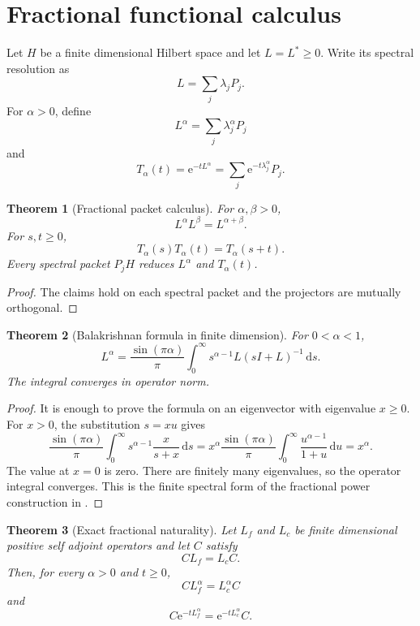 \documentclass{aomart}
\newtheorem{theorem}{Theorem}[section]
\theoremstyle{definition}
\theoremstyle{remark}
\newcommand{\e}{\mathrm e}
\newcommand{\dd}{\,\mathrm d}
\begin{document}
\section{Fractional functional calculus}\label{sec:fractional}

Let \(H\) be a finite dimensional Hilbert space and let \(L=L^*\geq0\). Write its spectral resolution as
\[
L=\sum_j\lambda_jP_j.
\]
For \(\alpha>0\), define
\[
L^\alpha
=
\sum_j\lambda_j^\alpha P_j
\]
and
\[
T_\alpha(t)
=
\e^{-tL^\alpha}
=
\sum_j\e^{-t\lambda_j^\alpha}P_j.
\]

\begin{theorem}[Fractional packet calculus]\label{thm:fractional_packet_calculus}
For \(\alpha,\beta>0\),
\[
L^\alpha L^\beta=L^{\alpha+\beta}.
\]
For \(s,t\geq0\),
\[
T_\alpha(s)T_\alpha(t)=T_\alpha(s+t).
\]
Every spectral packet \(P_jH\) reduces \(L^\alpha\) and \(T_\alpha(t)\).
\end{theorem}

\begin{proof}
The claims hold on each spectral packet and the projectors are mutually orthogonal.
\end{proof}

\begin{theorem}[Balakrishnan formula in finite dimension]\label{thm:balakrishnan}
For \(0<\alpha<1\),
\[
L^\alpha
=
\frac{\sin(\pi\alpha)}{\pi}
\int_0^\infty
s^{\alpha-1}L(sI+L)^{-1}
\dd s.
\]
The integral converges in operator norm.
\end{theorem}

\begin{proof}
It is enough to prove the formula on an eigenvector with eigenvalue \(x\geq0\). For \(x>0\), the substitution \(s=xu\) gives
\[
\frac{\sin(\pi\alpha)}{\pi}
\int_0^\infty
s^{\alpha-1}\frac{x}{s+x}\dd s
=x^\alpha
\frac{\sin(\pi\alpha)}{\pi}
\int_0^\infty\frac{u^{\alpha-1}}{1+u}\dd u
=x^\alpha.
\]
The value at \(x=0\) is zero. There are finitely many eigenvalues, so the operator integral converges. This is the finite spectral form of the fractional power construction in \cite{Balakrishnan1960}.
\end{proof}

\begin{theorem}[Exact fractional naturality]\label{thm:exact_fractional_naturality}
Let \(L_f\) and \(L_c\) be finite dimensional positive self adjoint operators and let \(C\) satisfy
\[
CL_f=L_cC.
\]
Then, for every \(\alpha>0\) and \(t\geq0\),
\[
CL_f^\alpha=L_c^\alpha C
\]
and
\[
C\e^{-tL_f^\alpha}
=
\e^{-tL_c^\alpha}C.
\]
\end{theorem}
\end{document}
